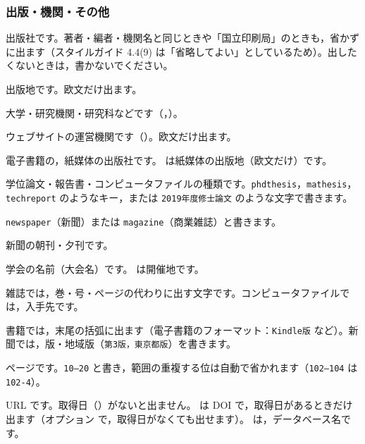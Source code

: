 \subsubsection{出版・機関・その他}
\begin{fieldlist}

出版社です。著者・編者・機関名と同じときや「国立印刷局」のときも，省かずに出ます（スタイルガイド 4.4(9) は「省略してよい」としているため）。出したくないときは，書かないでください。


出版地です。欧文だけ出ます。


大学・研究機関・研究科などです（，）。


ウェブサイトの運営機関です（）。欧文だけ出ます。


電子書籍の，紙媒体の出版社です。 は紙媒体の出版地（欧文だけ）です。


学位論文・報告書・コンピュータファイルの種類です。\texttt{phdthesis}，\texttt{mathesis}，\texttt{techreport} のようなキー，または \texttt{2019年度修士論文} のような文字で書きます。


\texttt{newspaper}（新聞）または \texttt{magazine}（商業雑誌）と書きます。


新聞の朝刊・夕刊です。


学会の名前（大会名）です。 は開催地です。


雑誌では，巻・号・ページの代わりに出す文字です。コンピュータファイルでは，入手先です。


書籍では，末尾の括弧に出ます（電子書籍のフォーマット：\texttt{Kindle版} など）。新聞では，版・地域版（\texttt{第3版，東京都版}）を書きます。


ページです。\texttt{10--20} と書き，範囲の重複する位は自動で省かれます（\texttt{102--104} は \texttt{102-4}）。


URL です。取得日（）がないと出ません。 は DOI で，取得日があるときだけ出ます（オプション  で，取得日がなくても出せます）。 は，データベース名です。
\end{fieldlist}

